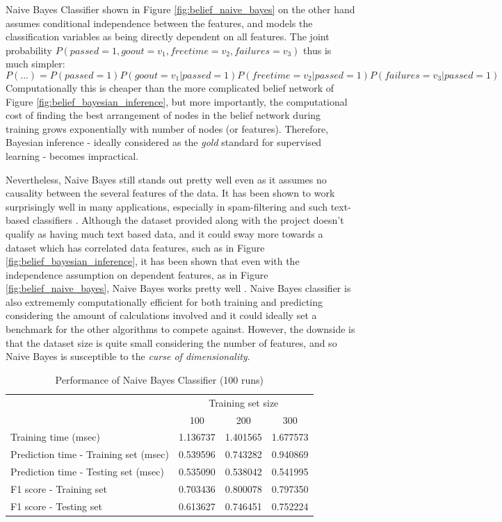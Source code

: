 \documentclass{article}
\begin{document}
	Naive Bayes Classifier shown in Figure \ref{fig:belief_naive_bayes} on the other hand assumes conditional independence between the features, and models the classification variables as being directly dependent on all features. The joint probability $P(passed=1, goout=v_1, freetime=v_2, failures=v_3)$ thus is much simpler: \[P(...) = P(passed=1)P(goout=v_1|passed=1)P(freetime=v_2|passed=1)P(failures=v_3|passed=1)\] 
	Computationally this is cheaper than the more complicated belief network of Figure \ref{fig:belief_bayesian_inference}, but more importantly, the computational cost of finding the best arrangement of nodes in the belief network during training grows exponentially with number of nodes (or features). Therefore, Bayesian inference - ideally considered as the \emph{gold} standard for supervised learning - becomes impractical. 
	
	Nevertheless, Naive Bayes still stands out pretty well even as it assumes no causality between the several features of the data. It has been shown to work surprisingly well in many applications, especially in spam-filtering and such text-based classifiers \cite{Metsis06}. Although the dataset provided along with the project doesn't qualify as having much text based data, and it could sway more towards a dataset which has correlated data features, such as in Figure \ref{fig:belief_bayesian_inference}, it has been shown that even with the independence assumption on dependent features, as in Figure \ref{fig:belief_naive_bayes}, Naive Bayes works pretty well \cite{Rish01}. Naive Bayes classifier is also extrememly computationally efficient for both training and predicting considering the amount of calculations involved and it could ideally set a benchmark for the other algorithms to compete against. However, the downside is that the dataset size is quite small considering the number of features, and so Naive Bayes is susceptible to the \emph{curse of dimensionality}.

	\begin{table}[h]
		\centering
		\begin{tabular}{l|ccc}
			\toprule
			{} & \multicolumn{3}{c}{Training set size} \\
			{} &       100 &       200 &       300 \\
			\midrule
			Training time (msec)                  &  1.136737 &  1.401565 &  1.677573 \\
			Prediction time - Training set (msec) &  0.539596 &  0.743282 &  0.940869 \\
			Prediction time - Testing set (msec)  &  0.535090 &  0.538042 &  0.541995 \\
			F1 score - Training set               &  0.703436 &  0.800078 &  0.797350 \\
			F1 score - Testing set                &  0.613627 &  0.746451 &  0.752224 \\
			\bottomrule
		\end{tabular}
		\caption{Performance of Naive Bayes Classifier (100 runs)}
		\label{tab:naive_bayes_100}
	\end{table}
	
\end{document}

